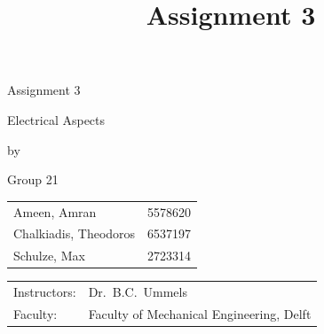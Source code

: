 \documentclass{tudelft-report}%
\title{Assignment 3}
\begin{document}
\begin{titlepage}
  \centering
  \vspace*{2cm}
  {\fontsize{40}{44}\selectfont Assignment 3\par}
  \vspace{0.8cm}
  {\LARGE Electrical Aspects\par}
  \vspace{1.2cm}
  {\small by\par}
  \vspace{1.2cm}
  {\LARGE Group 21\par}
  \vspace{1.2cm}
  \begin{tabular}{ll}
    Ameen, Amran            & 5578620 \\
    Chalkiadis, Theodoros   & 6537197 \\
    Schulze, Max            & 2723314 \\
  \end{tabular}
  \vfill
  \begin{flushleft}
  \begin{tabular}{ll}
    Instructors: & Dr.\ B.C.\ Ummels \\[4pt]
    Faculty:     & Faculty of Mechanical Engineering, Delft \\
  \end{tabular}
  \end{flushleft}
\end{titlepage}

\tableofcontents


\end{document}
